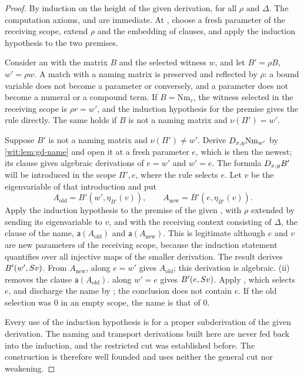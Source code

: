\begin{proof}
By induction on the height of the given derivation, for all $\rho$ and
$\Delta$.  The computation axioms,  and  are
immediate.  At , choose a fresh parameter of the receiving
scope, extend $\rho$ and the embedding of clauses, and apply the induction
hypothesis to the two premises.

Consider an  with the matrix $B$ and the selected witness
$w$, and let $B'=\rho B$, $w'=\rho w$.  A match with a naming matrix is
preserved and reflected by $\rho$: a bound variable does not become a
parameter or conversely, and a parameter does not become a numeral or a
compound term.  If $B=\mathrm{Nm}_r$, the witness selected in the receiving
scope is $\rho r=w'$, and the induction hypothesis for the premise gives the
rule directly.  The same holds if $B$ is not a naming matrix and
$\nu(\Pi')=w'$.

Suppose $B'$ is not a naming matrix and $\nu(\Pi')\neq w'$.  Derive
$D_{x,y}\mathrm{Nm}_{w'}$ by \cref{wit:lem:gd-name} and open it at a fresh
parameter $e$, which is then the newest; its clause gives algebraic
derivations of $e=w'$ and $w'=e$.  The formula $D_{x,y}B'$ will be
introduced in the scope $\Pi',e$, where the rule selects $e$.  Let $v$ be
the eigenvariable of that introduction and put
\[
 A_{\mathrm{old}}=B'(w',\eta_{B'}(v)),\qquad
 A_{\mathrm{new}}=B'(e,\eta_{B'}(v)).
\]
Apply the induction hypothesis to the premise of the given
, with $\rho$ extended by sending its eigenvariable to $v$,
and with the receiving context consisting of $\Delta$, the clause of the
name, $\mathsf{a}(A_{\mathrm{old}})$ and $\mathsf{a}(A_{\mathrm{new}})$.
This is legitimate although $e$ and $v$ are new parameters of the receiving
scope, because the induction statement quantifies over all injective maps of
the smaller derivation.  The result derives $B'(w',S v)$.  From
$A_{\mathrm{new}}$,  along $e=w'$ gives $A_{\mathrm{old}}$;
this derivation is algebraic.  (ii) removes the
clause $\mathsf{a}(A_{\mathrm{old}})$.   along $w'=e$ gives
$B'(e,S v)$.  Apply , which selects $e$, and discharge
the name by ; the conclusion does not contain $e$.  If the
old selection was $0$ in an empty scope, the name is that of $0$.

Every use of the induction hypothesis is for a proper subderivation of the
given derivation.  The naming and transport derivations built here are
never fed back into the induction, and the restricted cut was established
before.  The construction is therefore well founded and uses neither the
general cut nor weakening.
\end{proof}

